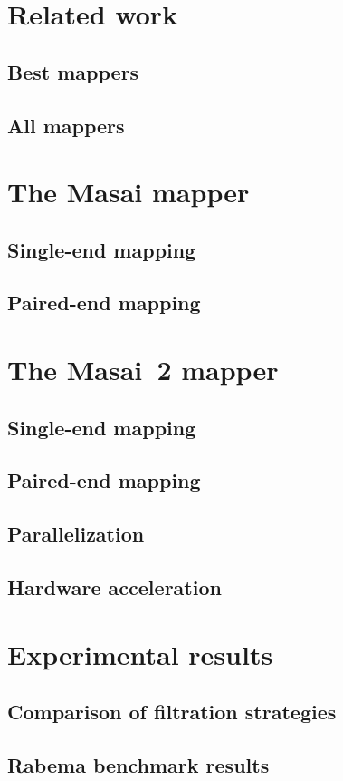 \section{Related work}
\subsection{Best mappers}
\subsection{All mappers}
\section{The Masai mapper}
\subsection{Single-end mapping}
\subsection{Paired-end mapping}
\section{The Masai~2 mapper}
\subsection{Single-end mapping}
\subsection{Paired-end mapping}
\subsection{Parallelization}
\subsection{Hardware acceleration}
\section{Experimental results}
\subsection{Comparison of filtration strategies}
\subsection{Rabema benchmark results}
